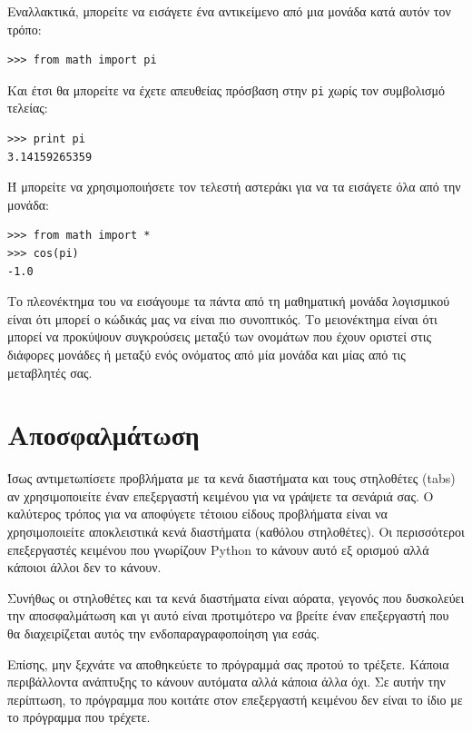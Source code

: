 \documentclass[10pt]{book}
\begin{document}
Εναλλακτικά, μπορείτε να εισάγετε ένα αντικείμενο από μια μονάδα κατά αυτόν
τον τρόπο:

\begin{verbatim}
>>> from math import pi
\end{verbatim}
%

Και έτσι θα μπορείτε να έχετε απευθείας πρόσβαση στην {\tt pi} χωρίς
τον συμβολισμό τελείας:


\begin{verbatim}
>>> print pi
3.14159265359
\end{verbatim}
%

Ή μπορείτε να χρησιμοποιήσετε τον τελεστή αστεράκι για να τα εισάγετε
όλα από την μονάδα:


\begin{verbatim}
>>> from math import *
>>> cos(pi)
-1.0
\end{verbatim}


Το πλεονέκτημα του να εισάγουμε τα πάντα από τη μαθηματική μονάδα λογισμικού είναι ότι μπορεί ο κώδικάς μας να είναι πιο συνοπτικός. Το μειονέκτημα είναι ότι μπορεί να προκύψουν συγκρούσεις μεταξύ των ονομάτων που έχουν οριστεί στις διάφορες μονάδες ή μεταξύ ενός ονόματος από μία μονάδα και μίας από τις μεταβλητές σας.



\section{Αποσφαλμάτωση}
\label{editor}

Ίσως αντιμετωπίσετε προβλήματα με τα κενά διαστήματα και τους στηλοθέτες (tabs) αν χρησιμοποιείτε έναν επεξεργαστή κειμένου για να γράψετε τα σενάριά σας.
Ο καλύτερος τρόπος για να αποφύγετε τέτοιου είδους προβλήματα είναι να χρησιμοποιείτε αποκλειστικά κενά διαστήματα (καθόλου στηλοθέτες). Οι περισσότεροι επεξεργαστές κειμένου που γνωρίζουν Python το κάνουν αυτό εξ ορισμού αλλά κάποιοι άλλοι δεν το κάνουν.

Συνήθως οι στηλοθέτες και τα κενά διαστήματα είναι αόρατα, γεγονός που 
δυσκολεύει την αποσφαλμάτωση και γι αυτό  είναι προτιμότερο να βρείτε έναν επεξεργαστή που θα διαχειρίζεται αυτός την ενδοπαραγραφοποίηση για εσάς.

Επίσης, μην ξεχνάτε να αποθηκεύετε το πρόγραμμά σας προτού το τρέξετε.
Κάποια περιβάλλοντα ανάπτυξης το κάνουν αυτόματα αλλά κάποια άλλα όχι.
Σε αυτήν την περίπτωση, το πρόγραμμα που κοιτάτε στον επεξεργαστή κειμένου δεν είναι το ίδιο με το πρόγραμμα που τρέχετε.
\end{document}
